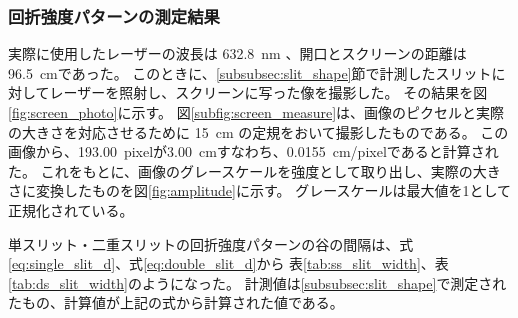 \documentclass[../../../main]{subfiles}
\begin{document}
\subsubsection{回折強度パターンの測定結果}
実際に使用したレーザーの波長は \SI{632.8}{\nano\meter} 、開口とスクリーンの距離は \SI{96.5}{cm}であった。
このときに、\ref{subsubsec:slit_shape}節で計測したスリットに対してレーザーを照射し、スクリーンに写った像を撮影した。
その結果を図\ref{fig:screen_photo}に示す。
図\ref{subfig:screen_measure}は、画像のピクセルと実際の大きさを対応させるために \SI{15}{cm} の定規をおいて撮影したものである。
この画像から、\SI{193.00}{pixel}が\SI{3.00}{cm}すなわち、\SI{0.0155}{cm/pixel}であると計算された。
これをもとに、画像のグレースケールを強度として取り出し、実際の大きさに変換したものを図\ref{fig:amplitude}に示す。
グレースケールは最大値を1として正規化されている。


単スリット・二重スリットの回折強度パターンの谷の間隔は、式\ref{eq:single_slit_d}、式\ref{eq:double_slit_d}から
表\ref{tab:ss_slit_width}、表\ref{tab:ds_slit_width}のようになった。
計測値は\ref{subsubsec:slit_shape}で測定されたもの、計算値が上記の式から計算された値である。






\end{document}
